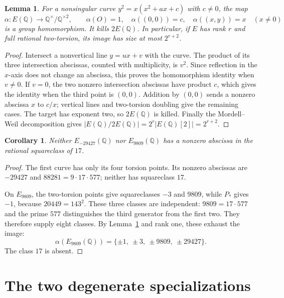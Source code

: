 \documentclass[11pt,a4paper]{article}
\newtheorem{lemma}[theorem]{Lemma}
\newtheorem{corollary}[theorem]{Corollary}
\theoremstyle{definition}\newtheorem{definition}[theorem]{Definition}
\newcommand{\Q}{\mathbb Q}\newcommand{\Z}{\mathbb Z}
\begin{document}
\begin{lemma}\label{lem:x-class}
For a nonsingular curve $y^2=x(x^2+ax+c)$ with $c\ne0$, the map
\[
 \alpha:E(\Q)\longrightarrow\Q^\times/\Q^{\times2},\qquad
 \alpha(O)=1,\quad\alpha((0,0))=c,\quad
 \alpha((x,y))=x\quad(x\ne0)
\]
is a group homomorphism.  It kills $2E(\Q)$.  In particular, if
$E$ has rank $r$ and full rational two-torsion, its image has size
at most $2^{r+2}$.
\end{lemma}
\begin{proof}
Intersect a nonvertical line $y=ux+v$ with the curve.  The product
of its three intersection abscissas, counted with multiplicity,
is $v^2$.  Since reflection in the $x$-axis does not change an
abscissa, this proves the homomorphism identity when $v\ne0$.
If $v=0$, the two nonzero intersection abscissas have product $c$,
which gives the identity when the third point is $(0,0)$.
Addition by $(0,0)$ sends a nonzero abscissa $x$ to $c/x$;
vertical lines and two-torsion doubling give the remaining cases.
The target has exponent two, so $2E(\Q)$ is killed.  Finally the
Mordell--Weil decomposition gives
$|E(\Q)/2E(\Q)|=2^r|E(\Q)[2]|=2^{r+2}$.
\end{proof}

\begin{corollary}\label{cor:class17}
Neither $E_{-29427}(\Q)$ nor $E_{9809}(\Q)$ has a nonzero
abscissa in the rational squareclass of $17$.
\end{corollary}
\begin{proof}
The first curve has only its four torsion points.  Its nonzero
abscissas are $-29427$ and $88281=9\cdot17\cdot577$; neither has
squareclass $17$.

On $E_{9809}$, the two-torsion points give squareclasses $-3$ and
$9809$, while $P_*$ gives $-1$, because $20449=143^2$.
These three classes are independent: $9809=17\cdot577$ and the
prime $577$ distinguishes the third generator from the first two.
They therefore supply eight classes.  By Lemma~\ref{lem:x-class}
and rank one, these exhaust the image:
\[
          \alpha(E_{9809}(\Q))
          =\{\pm1,\ \pm3,\ \pm9809,\ \pm29427\}.
\]
The class $17$ is absent.
\end{proof}

\section{The two degenerate specializations}
\end{document}
